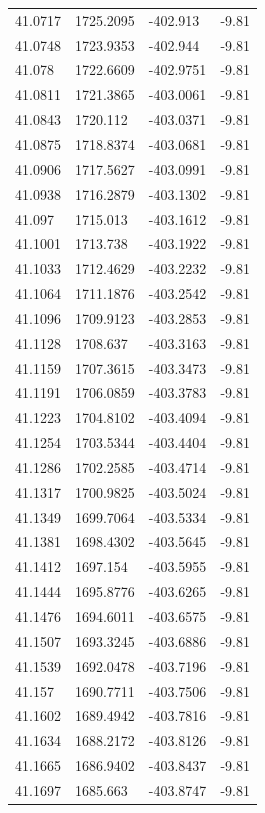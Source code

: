 \begin{table}[H]
\begin{tabular}{llll}
41.0717 & 1725.2095 & -402.913 & -9.81 \\
41.0748 & 1723.9353 & -402.944 & -9.81 \\
41.078 & 1722.6609 & -402.9751 & -9.81 \\
41.0811 & 1721.3865 & -403.0061 & -9.81 \\
41.0843 & 1720.112 & -403.0371 & -9.81 \\
41.0875 & 1718.8374 & -403.0681 & -9.81 \\
41.0906 & 1717.5627 & -403.0991 & -9.81 \\
41.0938 & 1716.2879 & -403.1302 & -9.81 \\
41.097 & 1715.013 & -403.1612 & -9.81 \\
41.1001 & 1713.738 & -403.1922 & -9.81 \\
41.1033 & 1712.4629 & -403.2232 & -9.81 \\
41.1064 & 1711.1876 & -403.2542 & -9.81 \\
41.1096 & 1709.9123 & -403.2853 & -9.81 \\
41.1128 & 1708.637 & -403.3163 & -9.81 \\
41.1159 & 1707.3615 & -403.3473 & -9.81 \\
41.1191 & 1706.0859 & -403.3783 & -9.81 \\
41.1223 & 1704.8102 & -403.4094 & -9.81 \\
41.1254 & 1703.5344 & -403.4404 & -9.81 \\
41.1286 & 1702.2585 & -403.4714 & -9.81 \\
41.1317 & 1700.9825 & -403.5024 & -9.81 \\
41.1349 & 1699.7064 & -403.5334 & -9.81 \\
41.1381 & 1698.4302 & -403.5645 & -9.81 \\
41.1412 & 1697.154 & -403.5955 & -9.81 \\
41.1444 & 1695.8776 & -403.6265 & -9.81 \\
41.1476 & 1694.6011 & -403.6575 & -9.81 \\
41.1507 & 1693.3245 & -403.6886 & -9.81 \\
41.1539 & 1692.0478 & -403.7196 & -9.81 \\
41.157 & 1690.7711 & -403.7506 & -9.81 \\
41.1602 & 1689.4942 & -403.7816 & -9.81 \\
41.1634 & 1688.2172 & -403.8126 & -9.81 \\
41.1665 & 1686.9402 & -403.8437 & -9.81 \\
41.1697 & 1685.663 & -403.8747 & -9.81 \\

\end{tabular}
\end{table}
